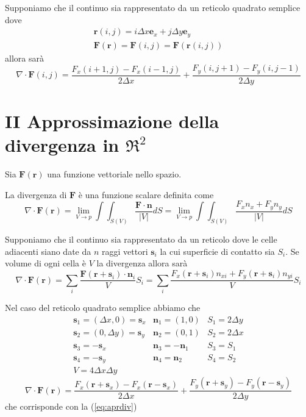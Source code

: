 \documentclass[a4paper,11pt]{article}
\begin{document}
Supponiamo che il continuo sia rappresentato da un reticolo quadrato semplice dove 
\[
\begin{array}{c}
  \mathbf{r}(i,j) = i \Delta x \mathbf{e}_x + j \Delta y \mathbf{e}_y
  \\
  \mathbf{F}(\mathbf{r}) = \mathbf{F}(i,j) = \mathbf{F}(\mathbf{r}(i,j))
\end{array} 
\]
allora sarà
\begin{equation}
\label{eq:aprdiv}
  \nabla \cdot \mathbf{F}(i,j) =
    \frac{F_x(i+1,j)-F_x(i-1,j)}{2 \Delta x} +
    \frac{F_y(i,j+1)-F_y(i,j-1)}{2 \Delta y}
\end{equation}


\section{II Approssimazione della divergenza in $ \Re^2 $}

Sia $ \mathbf{F}(\mathbf{r}) $ una funzione vettoriale nello spazio.

La divergenza di $ \mathbf{F} $ è una funzione scalare definita come 
\[
  \nabla \cdot \mathbf{F}(\mathbf{r})
   = \lim_{V\rightarrow p} \int \int_{S(V)} \frac{\mathbf{F} \cdot \mathbf{n}}{|V|} dS
   = \lim_{V\rightarrow p} \int \int_{S(V)}
    \frac{F_x n_x + F_y n_y}{|V|} dS
\]

Supponiamo che il continuo sia rappresentato da un reticolo dove 
le celle adiacenti siano date da $ n $ raggi vettori $ \mathbf{s}_i $
la cui superficie di contatto sia $ S_i $.
Se volume di ogni cella è $ V $ la divergenza allora sarà
\begin{equation}
  \label{eq:iiaprdiv}
  \nabla \cdot \mathbf{F}(\mathbf{r})
   = \sum_i \frac{\mathbf{F}(\mathbf{r}+\mathbf{s}_i) \cdot \mathbf{n}_i}{V} S_i
   = \sum_i \frac{F_x(\mathbf{r}+\mathbf{s}_i) n_{xi}+F_y(\mathbf{r}+\mathbf{s}_i) n_{yi}}{V} S_i
\end{equation}

Nel caso del reticolo quadrato semplice abbiamo che
\[
\begin{array}{lll}
  \mathbf{s}_1=(\Delta x,0) = \mathbf{s}_x & \mathbf{n}_1=(1,0) & S_1 = 2 \Delta y
  \\
  \mathbf{s}_2=(0, \Delta y) = \mathbf{s}_y & \mathbf{n}_2=(0,1) & S_2 = 2 \Delta x
  \\ 
  \mathbf{s}_3=-\mathbf{s}_x & \mathbf{n}_3=-\mathbf{n}_1 & S_3 = S_1
  \\
  \mathbf{s}_4=-\mathbf{s}_y & \mathbf{n}_4=\mathbf{n}_2 & S_4 = S_2
  \\
  V = 4 \Delta x \Delta y
\end{array}
\]
\begin{equation}
  \nabla \cdot \mathbf{F}(\mathbf{r}) =
    \frac{F_x(\mathbf{r} + \mathbf{s}_x) - F_x(\mathbf{r} - \mathbf{s}_x)}{2 \Delta x}+
    \frac{F_y(\mathbf{r} + \mathbf{s}_y) - F_y(\mathbf{r} - \mathbf{s}_y)}{2 \Delta y}
\end{equation}
che corrisponde con la (\ref{eq:aprdiv})
\end{document}
